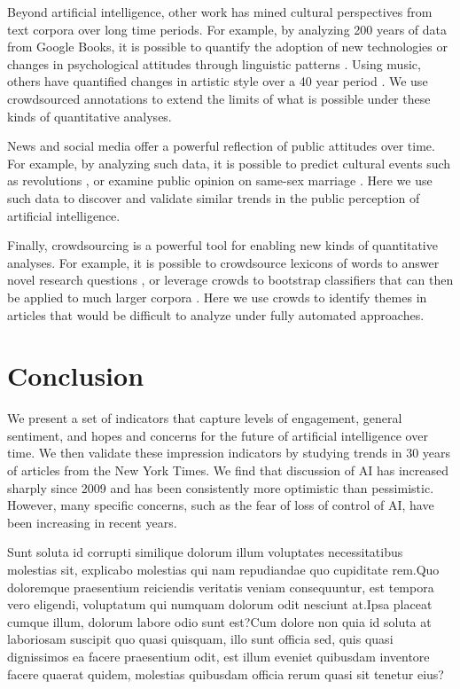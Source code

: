 \documentclass[letterpaper]{article}
\begin{document}
Beyond artificial intelligence, other work has mined cultural perspectives from text corpora over long time periods. For example, by analyzing 200 years of data from Google Books, it is possible to quantify the adoption of new technologies or changes in psychological attitudes through linguistic patterns \cite{google-culture,psych-culture}. Using music, others have quantified changes in artistic style over a 40 year period \cite{music-over-time}. We use crowdsourced annotations to extend the limits of what is possible under these kinds of quantitative analyses.


News and social media offer a powerful reflection of public attitudes over time. For example, by analyzing such data, it is possible to predict cultural events such as revolutions \cite{future1,future2}, or examine public opinion on same-sex marriage \cite{marriage}. Here we use such data to discover and validate similar trends in the public perception of artificial intelligence.

Finally, crowdsourcing is a powerful tool for enabling new kinds of quantitative analyses. For example, it is possible to crowdsource lexicons of words to answer novel research questions \cite{empath}, or leverage crowds to bootstrap classifiers that can then be applied to much larger corpora \cite{politeness,dogmatism}. Here we use crowds to identify themes in articles that would be difficult to analyze under fully automated approaches.

\section{Conclusion}
We present a set of indicators that capture levels of engagement, general sentiment, and hopes and concerns for the future of artificial intelligence over time. We then validate these impression indicators by studying trends in 30 years of articles from the New York Times. We find that discussion of AI has increased sharply since 2009 and has been consistently more optimistic than pessimistic. However, many specific concerns, such as the fear of loss of control of AI, have been increasing in recent years.




Sunt soluta id corrupti similique dolorum illum voluptates necessitatibus molestias sit, explicabo molestias qui nam repudiandae quo cupiditate rem.Quo doloremque praesentium reiciendis veritatis veniam consequuntur, est tempora vero eligendi, voluptatum qui numquam dolorum odit nesciunt at.Ipsa placeat cumque illum, dolorum labore odio sunt est?Cum dolore non quia id soluta at laboriosam suscipit quo quasi quisquam, illo sunt officia sed, quis quasi dignissimos ea facere praesentium odit, est illum eveniet quibusdam inventore facere quaerat quidem, molestias quibusdam officia rerum quasi sit tenetur eius?\clearpage

\end{document}
